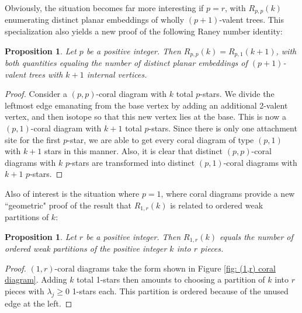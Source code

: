 \documentclass[documentfleqn,12pt]{amsart}
\newtheorem{proposition}[theorem]{Proposition}
\begin{document}
Obviously, the situation becomes far more interesting if $p=r$, with $R_{p,p}(k)$ enumerating distinct planar embeddings of wholly $(p+1)$-valent trees.  This specialization also yields a new proof of the following Raney number identity:

\begin{proposition}
\label{thm: raney interpretation p=r}
Let $p$ be a positive integer.  Then $R_{p,p}(k) = R_{p,1}(k+1)$, with both quantities equaling the number of distinct planar embeddings of $(p+1)$-valent trees with $k+1$ internal vertices.
\end{proposition}
\begin{proof}
	Consider a $(p,p)$-coral diagram with $k$ total $p$-stars.  We divide the leftmost edge emanating from the base vertex by adding an additional 2-valent vertex, and then isotope so that this new vertex lies at the base.  This is now a $(p,1)$-coral diagram with $k+1$ total $p$-stars.  Since there is only one attachment site for the first $p$-star, we are able to get every coral diagram of type $(p,1)$ with $k+1$ stars in this manner.  Also, it is clear that distinct $(p,p)$-coral diagrams with $k$ $p$-stars are transformed into distinct $(p,1)$-coral diagrams with $k+1$ $p$-stars.
\end{proof}

Also of interest is the situation where $p=1$, where coral diagrams provide a new ``geometric" proof of the result that $R_{1,r}(k)$ is related to ordered weak partitions of $k$:

\begin{proposition}
\label{thm: raney interpretation p=1}
Let $r$ be a positive integer.  Then $R_{1,r}(k)$ equals the number of ordered weak partitions of the positive integer $k$ into $r$ pieces.
\end{proposition}
\begin{proof}
$(1,r)$-coral diagrams take the form shown in Figure \ref{fig: (1,r) coral diagram}.  Adding $k$ total 1-stars then amounts to choosing a partition of $k$ into $r$ pieces with $\lambda_j \geq 0$ 1-stars each.  This partition is ordered because of the unused edge at the left.
\end{proof}
\end{document}
